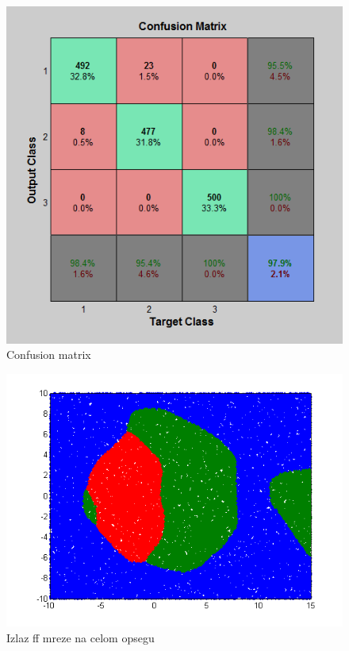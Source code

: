 \documentclass{report}
\begin{document}
\begin{enumerate}
\begin{enumerate}
\begin{figure}[!h]
\begin{center}
\includegraphics[scale=0.7]{B1confussionFF4early.png}
\caption{Confusion matrix}
\end{center}
\end{figure}

\begin{figure}[!h]
\begin{center}
\includegraphics[scale=0.8]{B1outputFF4earlyRandom50000.png}
\caption{Izlaz ff mreze na celom opsegu}
\end{center}
\end{figure}


\end{enumerate}
\end{enumerate}
\end{document}
